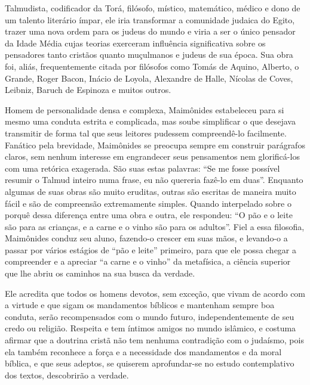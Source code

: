 Talmudista, codificador da Torá, filósofo, místico, matemático,
médico e dono de um talento literário ímpar, ele iria transformar a
comunidade judaica do Egito, trazer uma nova ordem para os judeus do
mundo e viria a ser o único pensador da Idade Média cujas teorias
exerceram influência significativa sobre os pensadores tanto cristãos
quanto muçulmanos e judeus de sua época. Sua obra foi, aliás,
frequentemente citada por filósofos como Tomás de Aquino, Alberto, o
Grande, Roger Bacon, Inácio de Loyola, Alexandre de Halle, Nícolas de
Coves, Leibniz, Baruch de Espinoza e muitos outros.

Homem de personalidade densa e complexa, Maimônides estabeleceu para si
mesmo uma conduta estrita e complicada, mas soube simplificar o que
desejava transmitir de forma tal que seus leitores pudessem
compreendê-lo facilmente. Fanático pela brevidade, Maimônides se
preocupa sempre em construir parágrafos claros, sem nenhum interesse em engrandecer seus
pensamentos nem glorificá-los com uma retórica exagerada. São suas
estas palavras: ``Se me fosse possível resumir o Talmud inteiro numa
frase, eu não quereria fazê-lo em duas''. Enquanto algumas de suas obras
são muito eruditas, outras são escritas de maneira muito fácil e são de
compreensão extremamente simples. Quando interpelado sobre o porquê
dessa diferença entre uma obra e outra, ele respondeu: ``O pão e o
leite são para as crianças, e a carne e o vinho são para os adultos''.
Fiel a essa filosofia, Maimônides conduz seu aluno, fazendo-o crescer em
suas mãos, e levando-o a passar por vários estágios de ``pão e leite''
primeiro, para que ele possa chegar a compreender e a apreciar ``a carne
e o vinho'' da metafísica, a ciência superior que lhe abriu os caminhos
na sua busca da verdade.

Ele acredita que todos os homens devotos, sem exceção, que vivam de
acordo com a virtude e que sigam os mandamentos bíblicos e mantenham
sempre boa conduta, serão recompensados com o mundo futuro,
independentemente de seu credo ou religião. Respeita e tem íntimos
amigos no mundo islâmico, e costuma afirmar que a doutrina cristã não
tem nenhuma contradição com o judaísmo, pois ela também reconhece a
força e a necessidade dos mandamentos e da moral bíblica, e que seus
adeptos, se quiserem aprofundar-se no estudo contemplativo dos textos,
descobrirão a verdade.

